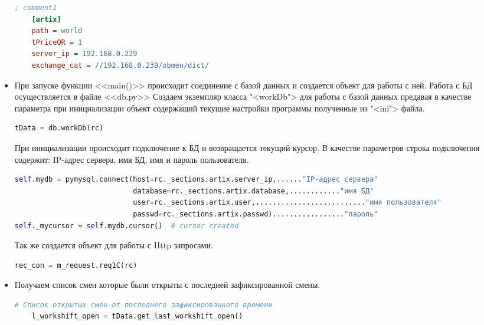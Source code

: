 \begin{itemize}
   \begin{lstlisting}[language={Ini}]
	; comment1
	[artix]
	path = world
	tPriceQR = 1
	server_ip = 192.168.0.239
	exchange_cat = //192.168.0.239/obmen/dict/
\end{lstlisting}

\item При запуске функции <<main()>> происходит соединение с базой данных и создается объект для работы с ней. Работа с БД осуществляется в файле <<db.py>>
Создаем экземпляр класса "<workDb"> для работы с базой данных предавая в качестве параметра при инициализации объект содержащий текущие настройки программы полученные из "<ini"> файла.
\newline
	\begin{lstlisting}[language=Python, caption=Создание объекта БД]
    tData = db.workDb(rc)
	\end{lstlisting}


При инициализации происходит подключение к БД и возвращается текущий курсор.
В качестве параметров строка подключения содержит: IP-адрес сервера, имя БД, имя и пароль пользователя.
\newline
	\begin{lstlisting}[language=Python, caption=Соединение с БД]
self.mydb = pymysql.connect(host=rc._sections.artix.server_ip,......"IP-адрес сервера"
							database=rc._sections.artix.database,............"имя БД"
							user=rc._sections.artix.user,.........................."имя пользователя"
							passwd=rc._sections.artix.passwd)................."пароль"
self._mycursor = self.mydb.cursor()  # cursor created
	\end{lstlisting}




%	
Так же создается объект для работы с Http запросами.


	\begin{lstlisting}[language=Python, caption=Объект запрос]
	rec_con = m_request.req1C(rc)
		\end{lstlisting}


\item Получаем список смен которые были открыты с последней зафиксированной смены.

	\begin{lstlisting}[language=Python, caption=Список открытых смен]
	# Список открытых смен от последнего зафиксированного времени
	l_workshift_open = tData.get_last_workshift_open()
	\end{lstlisting}


\end{itemize}
